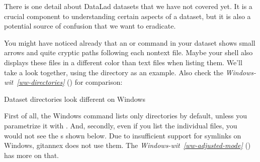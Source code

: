 \sphinxAtStartPar
There is one detail about DataLad datasets that we have not covered yet.
It is a crucial component to understanding certain aspects of a dataset, but it is also a potential source of confusion that we want to eradicate.

\sphinxAtStartPar
You might have noticed already that an  or  command in your dataset shows small arrows and quite cryptic paths following each non\sphinxhyphen{}text file.
Maybe your shell also displays these files in a different color than text files when listing them.
We’ll take a look together, using the  directory as an example.
Also check the \textit{Windows-wit}~{\windowswiticoninline}\textit{\ref{ww-directories}} {\hyperref[\detokenize{basics/101-115-symlinks:ww-directories}]{}} () for comparison:

\ignorespaces \begin{windowswit}[label={ww-directories}, before title={\thetcbcounter\ }, float, floatplacement=tb, check odd page=true]{Dataset directories look different on Windows}
\label{\detokenize{basics/101-115-symlinks:ww-directories}}

\sphinxAtStartPar
First of all, the Windows  command lists only directories by default, unless you parametrize it with .
And, secondly, even if you list the individual files, you would not see the {\hyperref[\detokenize{glossary:term-symlink}]{}}s shown below.
Due to insufficient support for symlinks on Windows, git\sphinxhyphen{}annex does not use them.
The \textit{Windows-wit}~{\windowswiticoninline}\textit{\ref{ww-adjusted-mode}} {\hyperref[\detokenize{basics/101-115-symlinks:ww-adjusted-mode}]{}} () has more on that.


\end{windowswit}

